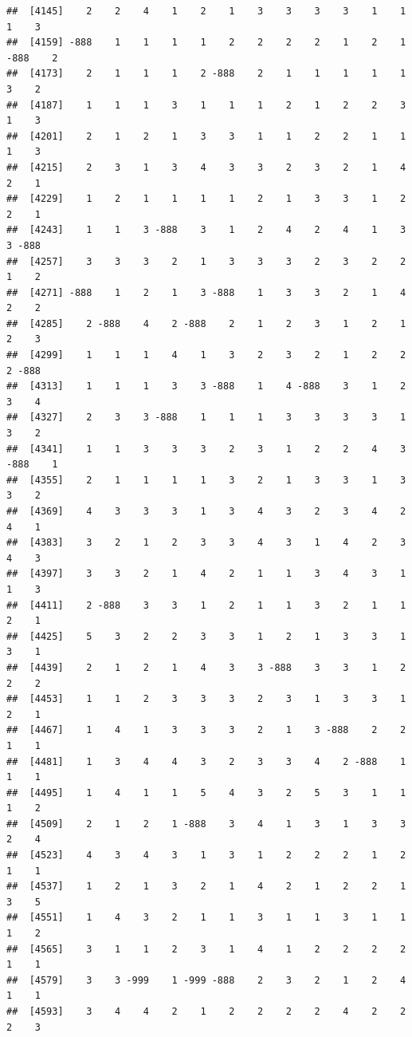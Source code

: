 \documentclass[
  12pt,
  openany]{book}
\begin{document}
\begin{verbatim}
##  [4145]    2    2    4    1    2    1    3    3    3    3    1    1    1    3
##  [4159] -888    1    1    1    1    2    2    2    2    1    2    1 -888    2
##  [4173]    2    1    1    1    2 -888    2    1    1    1    1    1    3    2
##  [4187]    1    1    1    3    1    1    1    2    1    2    2    3    1    3
##  [4201]    2    1    2    1    3    3    1    1    2    2    1    1    1    3
##  [4215]    2    3    1    3    4    3    3    2    3    2    1    4    2    1
##  [4229]    1    2    1    1    1    1    2    1    3    3    1    2    2    1
##  [4243]    1    1    3 -888    3    1    2    4    2    4    1    3    3 -888
##  [4257]    3    3    3    2    1    3    3    3    2    3    2    2    1    2
##  [4271] -888    1    2    1    3 -888    1    3    3    2    1    4    2    2
##  [4285]    2 -888    4    2 -888    2    1    2    3    1    2    1    2    3
##  [4299]    1    1    1    4    1    3    2    3    2    1    2    2    2 -888
##  [4313]    1    1    1    3    3 -888    1    4 -888    3    1    2    3    4
##  [4327]    2    3    3 -888    1    1    1    3    3    3    3    1    3    2
##  [4341]    1    1    3    3    3    2    3    1    2    2    4    3 -888    1
##  [4355]    2    1    1    1    1    3    2    1    3    3    1    3    3    2
##  [4369]    4    3    3    3    1    3    4    3    2    3    4    2    4    1
##  [4383]    3    2    1    2    3    3    4    3    1    4    2    3    4    3
##  [4397]    3    3    2    1    4    2    1    1    3    4    3    1    1    3
##  [4411]    2 -888    3    3    1    2    1    1    3    2    1    1    2    1
##  [4425]    5    3    2    2    3    3    1    2    1    3    3    1    3    1
##  [4439]    2    1    2    1    4    3    3 -888    3    3    1    2    2    2
##  [4453]    1    1    2    3    3    3    2    3    1    3    3    1    2    1
##  [4467]    1    4    1    3    3    3    2    1    3 -888    2    2    1    1
##  [4481]    1    3    4    4    3    2    3    3    4    2 -888    1    1    1
##  [4495]    1    4    1    1    5    4    3    2    5    3    1    1    1    2
##  [4509]    2    1    2    1 -888    3    4    1    3    1    3    3    2    4
##  [4523]    4    3    4    3    1    3    1    2    2    2    1    2    1    1
##  [4537]    1    2    1    3    2    1    4    2    1    2    2    1    3    5
##  [4551]    1    4    3    2    1    1    3    1    1    3    1    1    1    2
##  [4565]    3    1    1    2    3    1    4    1    2    2    2    2    1    1
##  [4579]    3    3 -999    1 -999 -888    2    3    2    1    2    4    1    1
##  [4593]    3    4    4    2    1    2    2    2    2    4    2    2    2    3

\end{verbatim}
\end{document}
